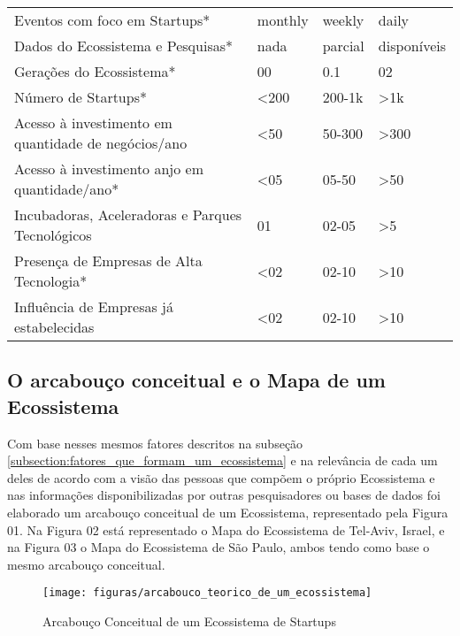 \begin{table}[!htb]
\begin{tabular}{llll}
Eventos com foco em Startups*                              &   monthly  &   weekly   &    daily \\
Dados do Ecossistema e Pesquisas*                          &    nada    & parcial &disponíveis  \\
Gerações do Ecossistema*                                   &     00     &    0.1     &    02    \\
Número de Startups*                                        &    <200    &   200-1k   &    >1k   \\
Acesso à investimento em quantidade de negócios/ano        &    <50     &   50-300   &    >300  \\
Acesso à investimento anjo em quantidade/ano*              &    <05     &   05-50    &    >50   \\
Incubadoras, Aceleradoras e Parques Tecnológicos           &     01     &    02-05   &    >5    \\
Presença de Empresas de Alta Tecnologia*                   &    <02     &   02-10    &    >10   \\
Influência de Empresas já estabelecidas                    &    <02     &   02-10    &    >10   \\
\end{tabular}
\end{table}

\subsection{O arcabouço conceitual e o Mapa de um Ecossistema}
\label{subsection:arcabouco_conceitual_e_modelo}

Com base nesses mesmos fatores descritos na subseção \ref{subsection:fatores_que_formam_um_ecossistema} e na relevância de cada um deles de acordo com a visão das pessoas que compõem o próprio Ecossistema e nas informações disponibilizadas por outras pesquisadores ou bases de dados foi elaborado um arcabouço conceitual de um Ecossistema, representado pela Figura 01. Na Figura 02 está representado o Mapa do Ecossistema de Tel-Aviv, Israel, e na Figura 03 o Mapa do Ecossistema de São Paulo, ambos tendo como base o mesmo arcabouço conceitual.

\begin{figure}[!htb]
\centering
\texttt{[image: figuras/arcabouco\_teorico\_de\_um\_ecossistema]}
\caption{Arcabouço Conceitual de um Ecossistema de Startups}
\label{Rotulo}
\end{figure}

